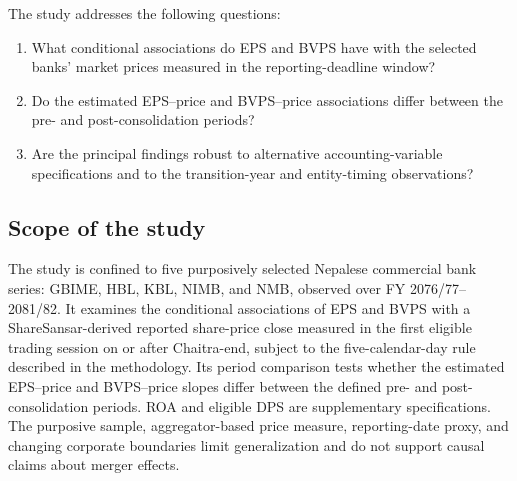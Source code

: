 The study addresses the following questions:
{\renewcommand{\theenumi}{\Roman{enumi}}
\begin{enumerate}[label=\Roman*.,align=right,leftmargin=44.2pt,labelwidth=30pt,labelsep=14.2pt]
  \item What conditional associations do EPS and BVPS have with the selected banks' market prices measured in the reporting-deadline window?
  \item Do the estimated EPS--price and BVPS--price associations differ between the pre- and post-consolidation periods?
  \item Are the principal findings robust to alternative accounting-variable specifications and to the transition-year and entity-timing observations?
\end{enumerate}
}

\subsection{Scope of the study}
\begin{sloppypar}
The study is confined to five purposively selected Nepalese commercial bank
series: GBIME, HBL, KBL, NIMB, and NMB, observed over FY 2076/77--2081/82. It
examines the conditional associations of EPS and BVPS with a ShareSansar-derived
reported share-price close measured in the first eligible trading session on
or after Chaitra-end, subject to the five-calendar-day rule described in the
methodology. Its period comparison tests whether the estimated EPS--price and
BVPS--price slopes differ between the defined pre- and post-consolidation
periods. ROA and eligible DPS are supplementary specifications. The purposive
sample, aggregator-based price measure, reporting-date proxy, and changing
corporate boundaries limit generalization and do not support causal claims
about merger effects.
\end{sloppypar}
